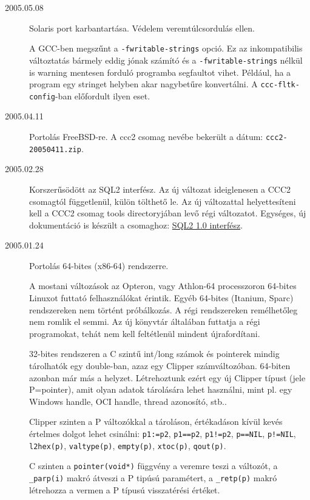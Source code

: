 \begin{description}
\label{20050508}
\item[2005.05.08]
    Solaris port karbantartása. 
    Védelem veremtúlcsordulás ellen.
    
    A GCC-ben megszűnt a \verb!-fwritable-strings! opció.
    Ez az inkompatibilis változtatás bármely eddig jónak számító
    és a \verb!-fwritable-strings! nélkül is warning mentesen forduló 
    programba segfaultot vihet. Például, ha a program egy stringet 
    helyben akar nagybetűre konvertálni. A \verb!ccc-fltk-config!-ban 
    előfordult ilyen eset.

\label{FREEBSD}
\item[2005.04.11]
    Portolás FreeBSD-re. 
    A ccc2 csomag nevébe bekerült a dátum: \verb!ccc2-20050411.zip!.

\label{SQL2}
\item[2005.02.28]
    Korszerűsödött az SQL2 interfész. Az új változat 
    ideiglenesen a CCC2 csomagtól függetlenül, külön tölthető le.
    Az új változattal helyettesíteni kell a CCC2 csomag tools 
    directoryjában levő régi változatot. Egységes, új dokumentáció 
    is készült a csomaghoz: 
    \href{http://ok.comfirm.hu/ccc2/sql2.html}{SQL2 1.0 interfész}.

\label{64BIT}
\item[2005.01.24]
    Portolás 64-bites (x86-64) rendszerre.
    
    A mostani változások az Opteron, vagy Athlon-64 
    processzoron 64-bites Linuxot futtató felhasználókat érintik. 
    Egyéb 64-bites (Itanium, Sparc) rendszereken nem történt próbálkozás.  
    A régi rendszereken remélhetőleg nem romlik el semmi.
    Az új könyvtár általában futtatja a régi programokat, tehát nem kell
    feltétlenül mindent újrafordítani.
    
    32-bites rendszeren a C szintű int/long számok és pointerek 
    mindig tárolhatók egy double-ban, azaz egy Clipper számváltozóban.
    64-biten azonban már más a helyzet. Létrehoztunk ezért egy új Clipper 
    típust (jele P=pointer), amit olyan adatok tárolására lehet használni,
    mint pl. egy Windows handle, OCI handle,  thread azonosító, stb..
    
    Clipper szinten a P változókkal a tároláson, értékadáson
    kívül kevés  értelmes dolgot lehet csinálni:
    \verb!p1:=p2!,
    \verb!p1==p2!, \verb|p1!=p2|, 
    \verb|p==NIL|, \verb|p!=NIL|, 
    \verb!l2hex(p)!, 
    \verb!valtype(p)!, 
    \verb!empty(p)!, 
    \verb!xtoc(p)!, 
    \verb!qout(p)!.
    
    C szinten a \verb!pointer(void*)! függvény a veremre teszi a változót,
    a \verb!_parp(i)! makró átveszi a P tipúsú paramétert, 
    a \verb!_retp(p)! makró létrehozza a vermen a P típusú visszatérési értéket.
    

\end{description}
